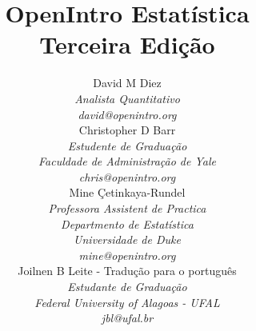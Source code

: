 
\title{\huge OpenIntro Estatística\vspace{1.5mm} \\ \Large Terceira Edição}
\author{David M Diez \\
\small\emph{Analista Quantitativo} \\
\vspace{6mm}%
\small\emph{david@openintro.org} \\
Christopher D Barr \\
\small\emph{Estudente de Graduação} \\
\small\emph{Faculdade de Administração de Yale} \\
\vspace{6mm}%
\small\emph{chris@openintro.org} \\
Mine \c{C}etinkaya-Rundel \\
\small\emph{Professora Assistent de Practica} \\
\small\emph{Departmento de Estatística} \\
\small\emph{Universidade de Duke} \\
\vspace{6mm}%
\small\emph{mine@openintro.org}\\
Joilnen B Leite - Tradução para o português \\ %
\small\emph{Estudante de Graduação} \\
\small\emph{Federal University of Alagoas - UFAL} \\
\small\emph{jbl@ufal.br}}

